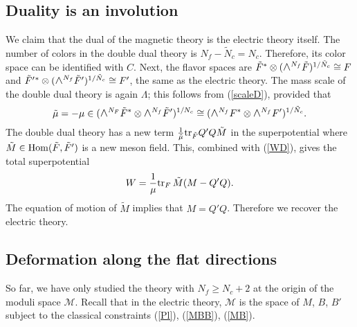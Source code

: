 \documentclass[lecture]{qft-l}
\newcommand{\Lam}{\varLambda}
\newcommand{\medwedge}{\mbox{\fontsize{12pt}{0pt}\selectfont $\wedge$}}
\newcommand{\inv}[1]{\frac{1}{#1}}
\newcommand{\tr}{{\rm tr}}
\newcommand{\MM}{{\mathcal M}}
\newcommand{\Hom}{{\rm Hom}}
\newcommand{\FT}{F'}%
\newcommand{\QT}{Q'}%
\newcommand{\BT}{B'}%
\newcommand{\ND}{\tilde{N}_c}
\newcommand{\FD}{\tilde{F}}
\newcommand{\MD}{\tilde{M}}
\newcommand{\FDT}{\tilde{F}'}
\newcommand{\muD}{\tilde{\mu}}
\newcommand{\LINE}{\medwedge^{N_f}F^*\otimes\medwedge^{N_f}\FT}
\numberwithin{figure}{chapter}
\begin{document}
\subsection{Duality is an involution}

We claim that the dual of the magnetic theory is the electric theory itself.
The number of colors in the double dual theory is $N_f-\ND=N_c$.
Therefore, its color space can be identified with $C$.
Next, the flavor spaces are $\FD^*\otimes(\medwedge^{N_f}\FD)^{1/\ND}\cong F$
and $\FDT{^{*}}\otimes(\medwedge^{N_f}\FDT)^{1/\ND}\cong\FT$, the same as 
the electric theory.
The mass scale of the double dual theory is again $\Lam$;
this follows from (\ref{scaleD}), provided that
	\begin{equation}
\muD=-\mu\in(\medwedge^{N_F}\FD^*\otimes\medwedge^{N_f}\FDT)^{1/N_c}
\cong(\LINE)^{1/\ND}.
	\end{equation}
The double dual theory has a new term $\inv{\muD}\tr_{\FD}\QT Q\MD$
in the superpotential where $\MD\in\Hom(\FD,\FDT)$ is a new meson field.  
This, combined with (\ref{WD}), gives the total superpotential
	\begin{equation}
W=\inv{\mu}\tr_F\,\MD(M-\QT Q).	
	\end{equation}
The equation of motion of $\MD$ implies that $M=\QT Q$.
Therefore we recover the electric theory.

\medskip\noindent
\subsection{ Deformation along the flat directions}

So far, we have only studied the theory with $N_f\ge N_c+2$ at the origin
of the moduli space $\MM$. 
Recall that in the electric theory, $\MM$ is the space of $M$, $B$, $\BT$
subject to the classical constraints (\ref{Pl}), (\ref{MBB}), (\ref{MB}).
\end{document}
